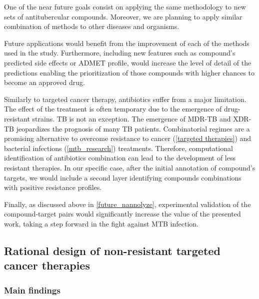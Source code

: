 \documentclass[11pt, b5paper,twoside]{tesi_upf}
\begin{document}
\par One of the near future goals consist on applying the same methodology to new sets of antitubercular compounds. Moreover, we are planning to apply similar combination of methods to other diseases and organisms.   
\par Future applications would benefit from the improvement of each of the methods used in the study. Furthermore, including new features such as compound's predicted side effects or ADMET profile, would increase the level of detail of the predictions enabling the prioritization of those compounds with higher chances to become an approved drug.  

\par Similarly to targeted cancer therapy, antibiotics suffer from a major limitation. The effect of the treatment is often temporary due to the emergence of drug-resistant strains. TB is not an exception. The emergence of MDR-TB and XDR-TB jeopardizes the prognosis of many TB patients. Combinatorial regimes are a promising alternative to overcome resistance to cancer (\cref{targeted therapies}) and bacterial infections (\cref{mtb_research}) treatments. Therefore, computational identification of antibiotics combination can lead to the development of less resistant therapies. In our specific case, after the initial annotation of compound's targets, we would include a second layer identifying compounds combinations with positive resistance profiles.   

\par Finally, as discussed above in \cref{future_nannolyze}, experimental validation of the compound-target pairs would significantly increase the value of the presented work, taking a step forward in the fight against MTB infection. 

 \subsection{Rational design of non-resistant targeted cancer therapies}
 
 
 
\subsubsection{Main findings} 
\end{document}
